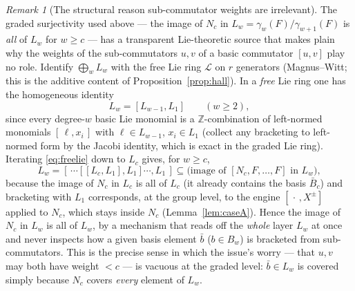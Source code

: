 \documentclass{amsart}
\theoremstyle{definition}
\theoremstyle{remark}
\newtheorem{remark}{Remark}
\begin{document}
\begin{remark}[The structural reason sub-commutator weights are irrelevant]
\label{rem:freelie}
The graded surjectivity used above --- the image of $N_c$ in
$L_w=\gamma_w(F)/\gamma_{w+1}(F)$ is \emph{all} of $L_w$ for $w\ge c$ --- has a
transparent Lie-theoretic source that makes plain why the weights of the
sub-commutators $u,v$ of a basic commutator $[u,v]$ play no role. Identify
$\bigoplus_w L_w$ with the free Lie ring $\mathcal L$ on $r$ generators
(Magnus--Witt; this is the additive content of Proposition~\ref{prop:hall}). In a
\emph{free} Lie ring one has the homogeneous identity
\begin{equation}\label{eq:freelie}
L_w=[L_{w-1},L_1]\qquad(w\ge2),
\end{equation}
since every degree-$w$ basic Lie monomial is a $\mathbb Z$-combination of left-normed
monomials $[\,\ell,x_i\,]$ with $\ell\in L_{w-1}$, $x_i\in L_1$ (collect any bracketing
to left-normed form by the Jacobi identity, which is exact in the graded Lie ring).
Iterating \eqref{eq:freelie} down to $L_c$ gives, for $w\ge c$,
\[
L_w=[\,\cdots[[L_c,L_1],L_1]\cdots,L_1\,]\subseteq \text{(image of $[N_c,F,\dots,F]$ in $L_w$)} ,
\]
because the image of $N_c$ in $L_c$ is all of $L_c$ (it already contains the basis
$\bar B_c$) and bracketing with $L_1$ corresponds, at the group level, to the engine
$[\,\cdot\,,X^{\pm}]$ applied to $N_c$, which stays inside $N_c$
(Lemma~\ref{lem:caseA}). Hence the image of $N_c$ in $L_w$ is all of $L_w$, by a
mechanism that reads off the \emph{whole} layer $L_w$ at once and never inspects how a
given basis element $\bar b$ ($b\in B_w$) is bracketed from sub-commutators. This is the
precise sense in which the issue's worry --- that $u,v$ may both have weight $<c$ --- is
vacuous at the graded level: $\bar b\in L_w$ is covered simply because $N_c$ covers
\emph{every} element of $L_w$.


\end{remark}
\end{document}
